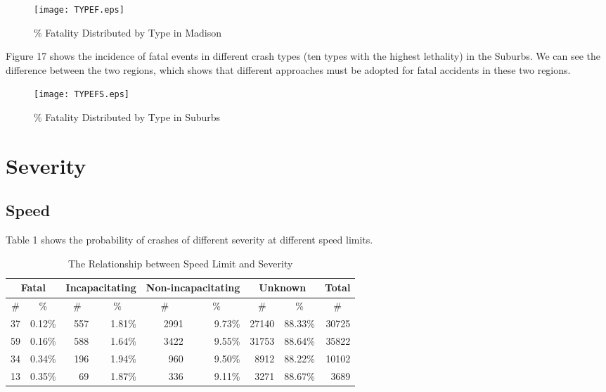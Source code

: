 \documentclass[10pt]{article}
\begin{document}
\begin{figure}[H]
\flushleft
\texttt{[image: TYPEF.eps]}
\caption{\% Fatality Distributed by Type in Madison}
\label{16}
\end{figure}

\newpage
Figure 17 shows the incidence of fatal events in different crash types (ten types with the highest lethality) in the Suburbs. We can see the difference between the two regions, which shows that different approaches must be adopted for fatal accidents in these two regions.

\begin{figure}[H]
\flushleft
\texttt{[image: TYPEFS.eps]}
\caption{\% Fatality Distributed by Type in Suburbs}
\label{17}
\end{figure}

\newpage
\section{Severity}
\subsection{Speed}
Table 1 shows the probability of crashes of different severity at different speed limits.

\begin{table}[H]
  \centering
  \caption{The Relationship between Speed Limit and Severity}
    \begin{tabular}{rrrrrrrrr}
    \multicolumn{2}{c}{Fatal} & \multicolumn{2}{c}{Incapacitating} & \multicolumn{2}{c}{Non-incapacitating} & \multicolumn{2}{c}{Unknown} & \multicolumn{1}{l}{Total} \\
    \hline
    \multicolumn{1}{c}{\#} & \multicolumn{1}{c}{\%} & \multicolumn{1}{c}{\#} & \multicolumn{1}{c}{\%} & \multicolumn{1}{c}{\#} & \multicolumn{1}{c}{\%} & \multicolumn{1}{c}{\#} & \multicolumn{1}{c}{\%} & \multicolumn{1}{c}{\#} \\
    \hline
    37    & 0.12\% & 557   & 1.81\% & 2991  & 9.73\% & 27140 & 88.33\% & 30725 \\
    59    & 0.16\% & 588   & 1.64\% & 3422  & 9.55\% & 31753 & 88.64\% & 35822 \\
    34    & 0.34\% & 196   & 1.94\% & 960   & 9.50\% & 8912  & 88.22\% & 10102 \\
    13    & 0.35\% & 69    & 1.87\% & 336   & 9.11\% & 3271  & 88.67\% & 3689 \\
    \hline
    \end{tabular}%
  \label{tab:addlabel}%
\end{table}%
\end{document}
